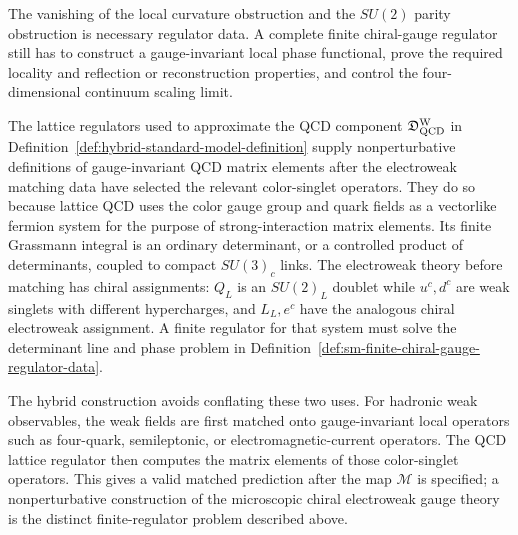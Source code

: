 \begin{remark}
The vanishing of the local curvature obstruction and the \(SU(2)\) parity
obstruction is necessary regulator data.  A complete finite chiral-gauge
regulator still has to construct a gauge-invariant local phase functional,
prove the required locality and reflection or reconstruction properties, and
control the four-dimensional continuum scaling limit.
\end{remark}

\begin{remark}
\label{rem:sm-lattice-qcd-inside-hybrid-sm}
The lattice regulators used to approximate the QCD component
\(\mathfrak D_{\rm QCD}^{\rm W}\) in
Definition~\ref{def:hybrid-standard-model-definition} supply nonperturbative
definitions of gauge-invariant QCD matrix elements after the electroweak
matching data have selected the relevant color-singlet operators.  They do
so because lattice QCD uses the color gauge group and quark fields as a
vectorlike fermion system for the purpose of strong-interaction matrix
elements.  Its finite Grassmann integral is an ordinary determinant, or a
controlled product of determinants, coupled to compact \(SU(3)_c\) links.
The electroweak theory before matching has chiral assignments: \(Q_L\) is an
\(SU(2)_L\) doublet while \(u^c,d^c\) are weak singlets with different
hypercharges, and \(L_L,e^c\) have the analogous chiral electroweak
assignment.  A finite regulator for that system must solve the determinant
line and phase problem in
Definition~\ref{def:sm-finite-chiral-gauge-regulator-data}.

The hybrid construction avoids conflating these two uses.  For hadronic weak
observables, the weak fields are first matched onto gauge-invariant local
operators such as four-quark, semileptonic, or electromagnetic-current
operators.  The QCD lattice regulator then computes the matrix elements of
those color-singlet operators.  This gives a valid matched prediction after
the map \(\mathcal M\) is specified; a nonperturbative construction of the
microscopic chiral electroweak gauge theory is the distinct finite-regulator
problem described above.
\end{remark}

